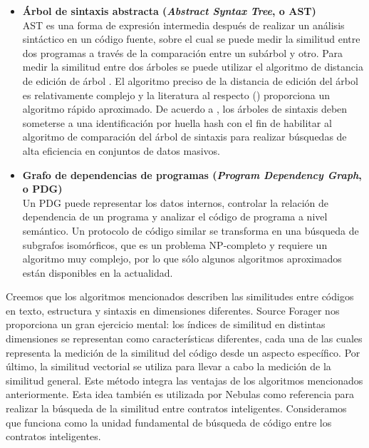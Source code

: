 \begin{itemize}
	\item \textbf{Árbol de sintaxis abstracta (\textit{Abstract Syntax Tree}, o AST)} \\
	AST es una forma de expresión intermedia después de realizar un análisis sintáctico en un código fuente, sobre el cual se puede medir la similitud entre dos programas a través de la comparación entre un subárbol y otro. Para medir la similitud entre dos árboles se puede utilizar el algoritmo de distancia de edición de árbol \cite{zhang1989simple}. El algoritmo preciso de la distancia de edición del árbol es relativamente complejo y la literatura al respecto (\cite{guha2002approximate}) proporciona un algoritmo rápido aproximado. De acuerdo a \cite{chilowicz2009syntax}, los árboles de sintaxis deben someterse a una identificación por huella hash con el fin de habilitar al algoritmo de comparación del árbol de sintaxis para realizar búsquedas de alta eficiencia en conjuntos de datos masivos.

	\item \textbf{Grafo de dependencias de programas (\textit{Program Dependency Graph}, o PDG)} \\
	Un PDG \cite{ferrante1987program} puede representar los datos internos, controlar la relación de dependencia de un programa y analizar el código de programa a nivel semántico. Un protocolo de código similar se transforma en una búsqueda de subgrafos isomórficos, que es un problema NP-completo y requiere un algoritmo muy complejo, por lo que sólo algunos algoritmos aproximados están disponibles en la actualidad.

\end{itemize}

Creemos que los algoritmos mencionados describen las similitudes entre códigos en texto, estructura y sintaxis en dimensiones diferentes. Source Forager \cite{kashyap2017source} nos proporciona un gran ejercicio mental: los índices de similitud en distintas dimensiones se representan como características diferentes, cada una de las cuales representa la medición de la similitud del código desde un aspecto específico. Por último, la similitud vectorial se utiliza para llevar a cabo la medición de la similitud general. Este método integra las ventajas de los algoritmos mencionados anteriormente. Esta idea también es utilizada por Nebulas como referencia para realizar la búsqueda de la similitud entre contratos inteligentes. Consideramos que funciona como la unidad fundamental de búsqueda de código entre los contratos inteligentes.

